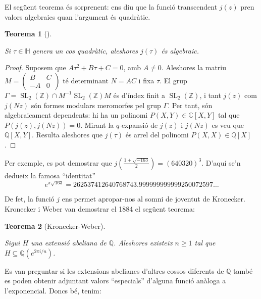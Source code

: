 \documentclass[
  letterpaper,
  DIV=11,
  numbers=noendperiod]{scrreprt}
\theoremstyle{plain}
\newtheorem{theorem}{Teorema}[chapter]
\theoremstyle{plain}
\theoremstyle{definition}
\theoremstyle{plain}
\theoremstyle{plain}
\theoremstyle{definition}
\theoremstyle{remark}
\begin{document}
El següent teorema és sorprenent: ens diu que la funció transcendent
\(j(z)\) pren valors algebraics quan l'argument és quadràtic.

\begin{theorem}[]\protect\hypertarget{thm-}{}\label{thm-}

Si \(\tau\in\mathbb{H}\) genera un cos quadràtic, aleshores \(j(\tau)\)
és algebraic.

\end{theorem}

\begin{proof}
Suposem que \(A\tau^2+B\tau+C=0\), amb \(A\neq 0\). Aleshores la matriu
\(M=\left(\begin{smallmatrix}B&C\\-A&0\end{smallmatrix}\right)\) té
determinant \(N = AC\) i fixa \(\tau\). El grup
\(\Gamma=\operatorname{SL}_2(\mathbb{Z})\cap M^{-1}\operatorname{SL}_2(\mathbb{Z})M\)
és d'índex finit a \(\operatorname{SL}_2(\mathbb{Z})\), i tant \(j(z)\)
com \(j(Nz)\) són formes modulars meromorfes pel grup \(\Gamma\). Per
tant, són algebraicament dependents: hi ha un polinomi
\(P(X,Y)\in \mathbb{C}[X,Y]\) tal que \(P(j(z), j(Nz))=0\). Mirant la
\(q\)-expansió de \(j(z)\) i \(j(Nz)\) es veu que \(\mathbb{Q}[X,Y]\).
Resulta aleshores que \(j(\tau)\) és arrel del polinomi
\(P(X,X)\in\mathbb{Q}[X]\).
\end{proof}

Per exemple, es pot demostrar que
\(j(\frac{1+\sqrt{-163}}{2}) = (640320)^3\). D'aquí se'n dedueix la
famosa ``identitat'' \[
e^{\pi\sqrt{163}} = 262537412640768743.999999999999250072597\ldots
\]

De fet, la funció \(j\) ens permet apropar-nos al somni de joventut de
Kronecker. Kronecker i Weber van demostrar el 1884 el següent teorema:

\begin{theorem}[Kronecker-Weber]\protect\hypertarget{thm-kronecker-weber}{}\label{thm-kronecker-weber}

Sigui \(H\) una extensió abeliana de \(\mathbb{Q}\). Aleshores existeix
\(n\geq 1\) tal que \(H\subseteq \mathbb{Q}(e^{2\pi i/n})\).

\end{theorem}

Es van preguntar si les extensions abelianes d'altres cossos diferents
de \(\mathbb{Q}\) també es poden obtenir adjuntant valors ``especials''
d'alguna funció anàloga a l'exponencial. Doncs bé, tenim:
\end{document}
